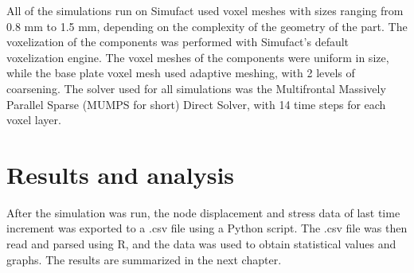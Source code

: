 \documentclass[../main.tex]{subfiles}
\begin{document}
All of the simulations run on Simufact used voxel meshes with sizes ranging from 0.8 mm to 1.5 mm, depending on the complexity of the geometry of the part. The voxelization of the components was performed with Simufact's default voxelization engine. The voxel meshes of the components were uniform in size, while the base plate voxel mesh used adaptive meshing, with 2 levels of coarsening. The solver used for all simulations was the Multifrontal Massively Parallel Sparse (MUMPS for short) Direct Solver, with 14 time steps for each voxel layer. 

\section{Results and analysis}

After the simulation was run, the node displacement and stress data of last time increment was exported to a .csv file using a Python script. The .csv file was then read and parsed using R, and the data was used to obtain statistical values and graphs. The results are summarized in the next chapter.
\end{document}
